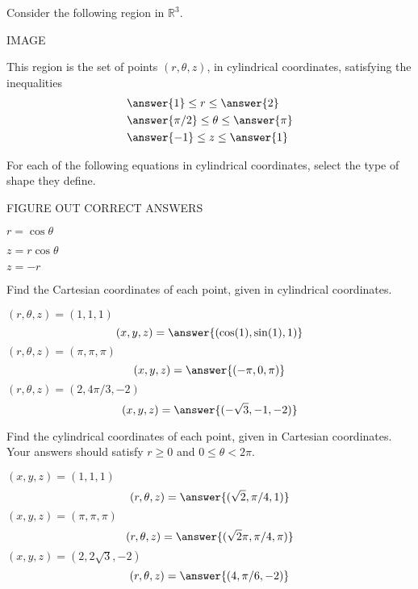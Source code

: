 \documentclass{ximera}
\begin{document}
\begin{problem}
Consider the following region in $\mathbb{R}^3$.

IMAGE

This region is the set of points $(r, \theta, z)$, in cylindrical coordinates, satisfying the inequalities
\begin{align*}
&\answer{1}\leq r\leq \answer{2}\\
&\answer{\pi/2}\leq\theta\leq\answer{\pi}\\
&\answer{-1}\leq z\leq\answer{1}
\end{align*}

\end{problem}

\begin{problem}
For each of the following equations in cylindrical coordinates, select the type of shape they define.

FIGURE OUT CORRECT ANSWERS

$r = \cos\theta$
\begin{multipleChoice}
\end{multipleChoice}

$z = r\cos\theta$
\begin{multipleChoice}
\end{multipleChoice}

$z = -r$
\begin{multipleChoice}
\end{multipleChoice}
\end{problem}

\begin{problem}
Find the Cartesian coordinates of each point, given in cylindrical coordinates.

$(r,\theta,z) = (1,1,1)$
\[
(x,y,z) = \answer{(\cos(1), \sin(1), 1)}
\]
$(r,\theta,z) = (\pi,\pi,\pi)$
\[
(x,y,z) = \answer{(-\pi, 0, \pi)}
\]
$(r,\theta,z) = (2,4\pi/3,-2)$
\[
(x,y,z) = \answer{(-\sqrt{3}, -1, -2)}
\]
\end{problem}

\begin{problem}
Find the cylindrical coordinates of each point, given in Cartesian coordinates. Your answers should satisfy $r\geq 0$ and $0\leq \theta < 2\pi$.

$(x,y,z) = (1,1,1)$
\[
(r,\theta,z) = \answer{(\sqrt{2}, \pi/4, 1)}
\]
$(x,y,z) = (\pi,\pi,\pi)$
\[
(r,\theta,z) = \answer{(\sqrt{2}\pi, \pi/4, \pi)}
\]
$(x,y,z) = (2,2\sqrt{3},-2)$
\[
(r,\theta,z) = \answer{(4, \pi/6, -2)}
\]
\end{problem}
\end{document}
